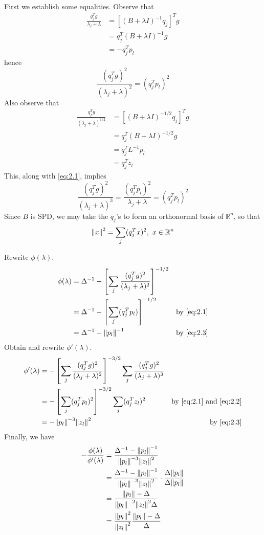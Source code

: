 \documentclass{article}
\def\mbb#1{\mathbb{#1}}
\def\bR{\mbb{R}}
\newcommand{\sbr}[1]{\left[#1\right]}
\newcommand{\inv}{^{-1}}
\renewcommand{\l}{\lambda}
\newcommand{\D}{\Delta}
\begin{document}
\begin{enumerate}
	First we establish some equalities. Observe that
	\begin{align*}
		\frac{q_j^Tg}{\l_j+\l} &= [(B+\l I)\inv q_j]^Tg \\
		&= q_j^T(B+\l I)\inv g \\
		&= -q_j^Tp_l
	\end{align*}
	hence
	\begin{equation}\label{eq:2.1}
		\frac{(q_j^Tg)^2}{(\l_j+\l)^2} = (q_j^Tp_l)^2
	\end{equation}
	Also observe that
	\begin{align*}
		\frac{q_j^Tg}{(\l_j+\l)^{1/2}} &= [(B+\l I)^{-1/2} q_j]^Tg \\
		&= q_j^T (B+\l I)^{-1/2} g \\
		&= q_j^T L\inv p_l \\
		&= q_j^T z_l
	\end{align*}
	This, along with \eqref{eq:2.1}, implies
	\begin{equation}\label{eq:2.2}
		\frac{(q_j^Tg)^2}{(\l_j+\l)^3} = \frac{(q_j^Tp_l)^2}{\l_j+\l} = (q_j^Tp_l)^2
	\end{equation}	
	Since $B$ is SPD, we may take the $q_j$'s to form an orthonormal basis of $\bR^n$, so that
	\begin{equation}\label{eq:2.3}
		\norm{x}^2 = \sum_j (q_j^Tx)^2,~ x\in\bR^n
	\end{equation}
	
	Rewrite $\phi(\l)$.
	\begin{align*}
		\phi(\l) &= \D\inv - \sbr{\sum_j \frac{(q_j^Tg)^2}{(\l_j+\l)^2}}^{-1/2} \\
		&= \D\inv - \sbr{\sum_j (q_j^Tp_l)}^{-1/2} & \text{by \eqref{eq:2.1}} \\
		&= \D\inv - \norm{p_l}\inv & \text{by \eqref{eq:2.3}}
	\end{align*}
	Obtain and rewrite $\phi'(\l)$.
	\begin{align*}
		\phi'(\l) &= -\sbr{\sum_j \frac{(q_j^Tg)^2}{(\l_j+\l)^2}}^{-3/2}\sum_j \frac{(q_j^Tg)^2}{(\l_j+\l)^3} \\
		&= -\sbr{\sum_j (q_j^Tp_l)^2}^{-3/2} \sum_j (q_j^Tz_l)^2 & \text{by \eqref{eq:2.1} and \eqref{eq:2.2}} \\
		&= -\norm{p_l}^{-3}\norm{z_l}^2 & \text{by \eqref{eq:2.3}}
	\end{align*}
	Finally, we have
	\begin{align*}
		-\frac{\phi(\l)}{\phi'(\l)} &= \frac{\D\inv - \norm{p_l}\inv}{\norm{p_l}^{-3}\norm{z_l}^2} \\
		&= \frac{\D\inv - \norm{p_l}\inv}{\norm{p_l}^{-3}\norm{z_l}^2} \cdot \frac{\D\norm{p_l}}{\D\norm{p_l}} \\
		&= \frac{\norm{p_l}-\D}{\norm{p_l}^{-2}\norm{z_l}^2\D} \\
		&= \frac{\norm{p_l}^2}{\norm{z_l}^2}\frac{\norm{p_l}-\D}{\D}
	\end{align*}


\end{enumerate}
\end{document}
